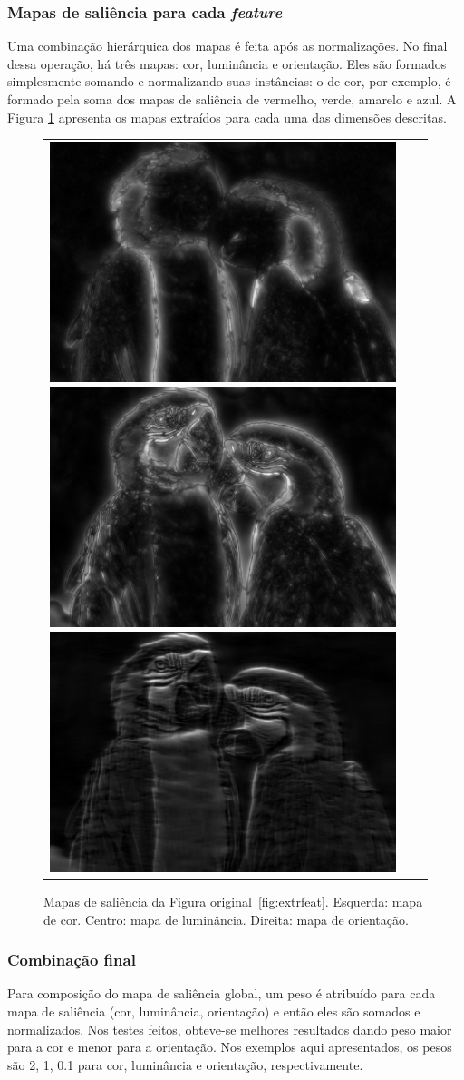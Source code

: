 \documentclass[11pt]{article}
\newcommand{\tit}[1]{\textit{#1}}
\begin{document}
\subsubsection{Mapas de saliência para cada \tit{feature}}
Uma combinação hierárquica dos mapas é feita após as normalizações.
No final dessa operação, há três mapas: cor, luminância
e orientação.
Eles são formados simplesmente somando e normalizando suas instâncias:
o de cor, por exemplo, é formado pela soma dos mapas de saliência de
vermelho, verde, amarelo e azul. A Figura \ref{fig:maps} apresenta os mapas extraídos para cada uma das dimensões descritas.
\begin{figure}[H]
\begin{center}
		\begin{tabular} {ccc}
            \includegraphics[width=0.3\linewidth]{img/arara_col_map.png}
            \includegraphics[width=0.3\linewidth]{img/arara_cst_map.png}
            \includegraphics[width=0.3\linewidth]{img/arara_ort_map.png}
		\end{tabular}
\end{center}
\caption{Mapas de saliência da Figura original~\ref{fig:extrfeat}.
    Esquerda: mapa de cor. Centro: mapa de luminância. Direita: mapa de
orientação.}
\label{fig:maps}
\end{figure}

\subsubsection{Combinação final}
Para composição do mapa de saliência global, um peso é atribuído para cada mapa de saliência (cor, luminância, orientação) e então eles são somados e normalizados. Nos testes feitos, obteve-se
melhores resultados dando peso maior para a cor e menor para a orientação.
Nos exemplos aqui apresentados, os pesos são 2, 1, 0.1 para cor, luminância e orientação,
respectivamente.
\end{document}
